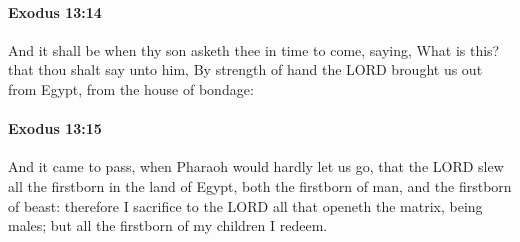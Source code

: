		\paragraph{Exodus 13:14} %
			\label{EXODUS-13-14}

			And it shall be when thy son asketh thee in time to come, saying, What is this? that thou shalt say unto him, By strength of hand the LORD brought us out from Egypt, from the house of bondage:


		\paragraph{Exodus 13:15} %
			\label{EXODUS-13-15}

			And it came to pass, when Pharaoh would hardly let us go, that the LORD slew all the firstborn in the land of Egypt, both the firstborn of man, and the firstborn of beast: therefore I sacrifice to the LORD all that openeth the matrix, being males; but all the firstborn of my children I redeem.

